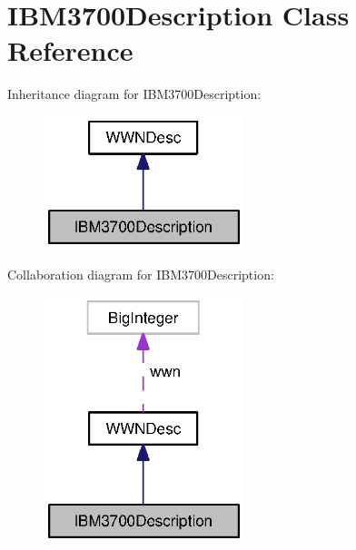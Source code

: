 \section{I\-B\-M3700\-Description Class Reference}
\label{classorg_1_1smallfoot_1_1wwn_1_1IBM3700Description}


Inheritance diagram for I\-B\-M3700\-Description\-:\nopagebreak
\begin{figure}[H]
\begin{center}
\leavevmode
\includegraphics[width=166pt]{classorg_1_1smallfoot_1_1wwn_1_1IBM3700Description__inherit__graph}
\end{center}
\end{figure}


Collaboration diagram for I\-B\-M3700\-Description\-:\nopagebreak
\begin{figure}[H]
\begin{center}
\leavevmode
\includegraphics[width=166pt]{classorg_1_1smallfoot_1_1wwn_1_1IBM3700Description__coll__graph}
\end{center}
\end{figure}
